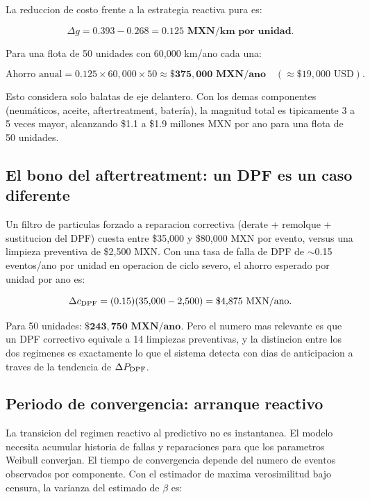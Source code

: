 \documentclass[11pt,a4paper]{article}
\begin{document}
La reduccion de costo frente a la estrategia reactiva pura es:

\begin{ahorro}
$$\Delta g = 0.393 - 0.268 = \mathbf{0.125\text{ MXN/km por unidad.}}$$

Para una flota de 50 unidades con 60,000 km/ano cada una:

$$\text{Ahorro anual} = 0.125 \times 60{,}000 \times 50
  \approx \mathbf{\$375{,}000\text{ MXN/ano}} \quad (\approx \$19{,}000\text{ USD}).$$

Esto considera solo balatas de eje delantero. Con los demas componentes
(neumáticos, aceite, aftertreatment, batería), la magnitud total es tipicamente
3 a 5 veces mayor, alcanzando \$1.1 a \$1.9 millones MXN por ano
para una flota de 50 unidades.
\end{ahorro}

\subsection{El bono del aftertreatment: un DPF es un caso diferente}

Un filtro de particulas forzado a reparacion correctiva (derate + remolque +
sustitucion del DPF) cuesta entre \$35,000 y \$80,000 MXN por evento,
versus una limpieza preventiva de \$2,500 MXN. Con una tasa de falla de
DPF de $\sim$0.15 eventos/ano por unidad en operacion de ciclo severo, el
ahorro esperado por unidad por ano es:

$$\Delta c_{\rm DPF} = (0.15)(35{,}000 - 2{,}500) = \$4{,}875\text{ MXN/ano.}$$

Para 50 unidades: $\mathbf{\$243{,}750\text{ MXN/ano}}$. Pero el numero mas
relevante es que un DPF correctivo equivale a 14 limpiezas preventivas,
y la distincion entre los dos regimenes es exactamente lo que el sistema
detecta con dias de anticipacion a traves de la tendencia de $\Delta P_{\rm DPF}$.

\subsection{Periodo de convergencia: arranque reactivo}

La transicion del regimen reactivo al predictivo no es instantanea.
El modelo necesita acumular historia de fallas y reparaciones para que los
parametros Weibull converjan. El tiempo de convergencia depende del numero
de eventos observados por componente. Con el estimador de maxima
verosimilitud bajo censura, la varianza del estimado de $\beta$ es:
\end{document}

